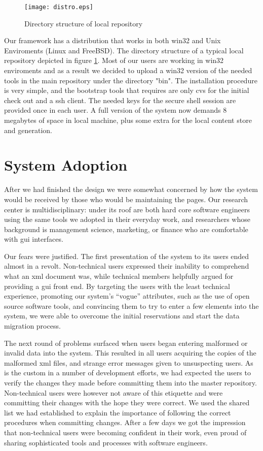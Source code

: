 \documentclass[10pt]{article}
\begin{document}
\begin{figure}
\texttt{[image: distro.eps]}
\caption{Directory structure of local repository}
\label{fig:eltrun-web-distro}
\end{figure}

Our framework has a distribution that works in both win32 and 
Unix Enviroments (Linux and FreeBSD). The directory structure of a typical local repository depicted in
figure \ref{fig:eltrun-web-distro}.
Most of our users are working in win32 enviroments and as 
a result we decided to upload a win32 version of the needed tools 
in the main repository under the directory "bin". The installation procedure is very simple,
and the bootstrap tools that requires are only cvs for 
the initial check out and a ssh client. The needed keys 
for the secure shell session are provided once in each user. 
A full version of the system now demands 8 megabytes of space 
in local machine, plus some extra for the local content store and generation.

\section{System Adoption}
\label{sec:adopt}
After we had finished the design we were somewhat concerned
by how the system would be received by those who would be
maintaining the pages.
Our research center is multidisciplinary: under its roof
are both hard core software engineers using the same tools
we adopted in their everyday work, and researchers whose
background is management science, marketing, or finance
who are comfortable with {\sc gui} interfaces.

Our fears were justified.
The first presentation of the system to its users ended
almost in a revolt.
Non-technical users expressed their inability to comprehend
what an {\sc xml} document was, while technical members
helpfully argued for providing a {\sc gui} front end.
By targeting the users with the least technical experience,
promoting our system's ``vogue'' attributes,
such as the use of open source software tools,
and convincing them to try to enter a few elements into
the system, we were able to overcome the initial reservations
and start the data migration process.

The next round of problems surfaced when users began entering
malformed or invalid data into the system.
This resulted in all users acquiring the copies of the malformed
{\sc xml} files, and strange error messages given to unsuspecting
users.
As is the custom in a number of development efforts, we had
expected the users to verify the changes they made before
committing them into the master repository.
Non-technical users were however not aware of this etiquette
and were committing their changes with the hope they were correct.
We used the shared list we had established to explain the
importance of following the correct procedures when committing changes.
After a few days we got the impression that non-technical users
were becoming confident in their work, even proud of sharing
sophisticated tools and processes with software engineers.
\end{document}
